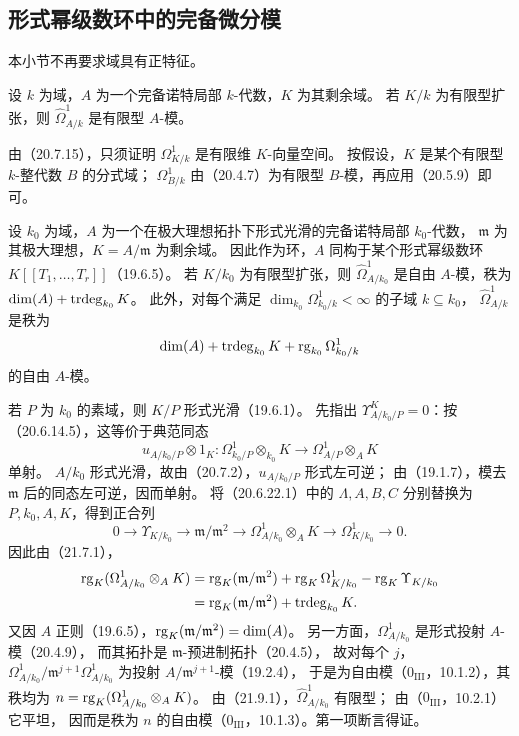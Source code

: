 \subsection{形式幂级数环中的完备微分模}
本小节不再要求域具有正特征。

设 $k$ 为域，$A$ 为一个完备诺特局部 $k$-代数，$K$ 为其剩余域。
若 $K/k$ 为有限型扩张，则 $\widehat\Omega^1_{A/k}$ 是有限型 $A$-模。

由（20.7.15），只须证明 $\Omega^1_{K/k}$ 是有限维 $K$-向量空间。
按假设，$K$ 是某个有限型 $k$-整代数 $B$ 的分式域；
$\Omega^1_{B/k}$ 由（20.4.7）为有限型 $B$-模，再应用（20.5.9）即可。

设 $k_0$ 为域，$A$ 为一个在极大理想拓扑下形式光滑的完备诺特局部 $k_0$-代数，
$\mathfrak m$ 为其极大理想，$K=A/\mathfrak m$ 为剩余域。
因此作为环，$A$ 同构于某个形式幂级数环 $K[[T_1,\ldots,T_r]]$（19.6.5）。
若 $K/k_0$ 为有限型扩张，则 $\widehat\Omega^1_{A/k_0}$ 是自由 $A$-模，秩为
$\dim(A)+\operatorname{trdeg}_{k_0}K$。
此外，对每个满足 $\dim_{k_0}\Omega^1_{k_0/k}<\infty$ 的子域 $k\subseteq k_0$，
$\widehat\Omega^1_{A/k}$ 是秩为
\[
 \dim(A)+\operatorname{trdeg}_{k_0}K+\operatorname{rg}_{k_0}\Omega^1_{k_0/k}
\]
的自由 $A$-模。

\eproof
若 $P$ 为 $k_0$ 的素域，则 $K/P$ 形式光滑（19.6.1）。
先指出 $\Upsilon^{K}_{A/k_0/P}=0$：按（20.6.14.5），这等价于典范同态
\[
 u_{A/k_0/P}\otimes1_K:
 \Omega^1_{k_0/P}\otimes_{k_0}K
 \longrightarrow\Omega^1_{A/P}\otimes_AK
\]
单射。
$A/k_0$ 形式光滑，故由（20.7.2），$u_{A/k_0/P}$ 形式左可逆；
由（19.1.7），模去 $\mathfrak m$ 后的同态左可逆，因而单射。
将（20.6.22.1）中的 $\Lambda,A,B,C$ 分别替换为 $P,k_0,A,K$，得到正合列
\[
 0\longrightarrow\Upsilon_{K/k_0}
 \longrightarrow\mathfrak m/\mathfrak m^2
 \longrightarrow\Omega^1_{A/k_0}\otimes_AK
 \longrightarrow\Omega^1_{K/k_0}\longrightarrow0.
\]
因此由（21.7.1），
\begin{align*}
 \operatorname{rg}_K(\Omega^1_{A/k_0}\otimes_AK)
 &=\operatorname{rg}_K(\mathfrak m/\mathfrak m^2)
   +\operatorname{rg}_K\Omega^1_{K/k_0}-\operatorname{rg}_K\Upsilon_{K/k_0}\\
 &=\operatorname{rg}_K(\mathfrak m/\mathfrak m^2)+\operatorname{trdeg}_{k_0}K.
\end{align*}
又因 $A$ 正则（19.6.5），$\operatorname{rg}_K(\mathfrak m/\mathfrak m^2)=\dim(A)$。
另一方面，$\Omega^1_{A/k_0}$ 是形式投射 $A$-模（20.4.9），
而其拓扑是 $\mathfrak m$-预进制拓扑（20.4.5），
故对每个 $j$，$\Omega^1_{A/k_0}/\mathfrak m^{j+1}\Omega^1_{A/k_0}$
为投射 $A/\mathfrak m^{j+1}$-模（19.2.4），
于是为自由模（$0_{\mathrm{III}}$，10.1.2），其秩均为
$n=\operatorname{rg}_K(\Omega^1_{A/k_0}\otimes_AK)$。
由（21.9.1），$\widehat\Omega^1_{A/k_0}$ 有限型；
由（$0_{\mathrm{III}}$，10.2.1）它平坦，
因而是秩为 $n$ 的自由模（$0_{\mathrm{III}}$，10.1.3）。第一项断言得证。


